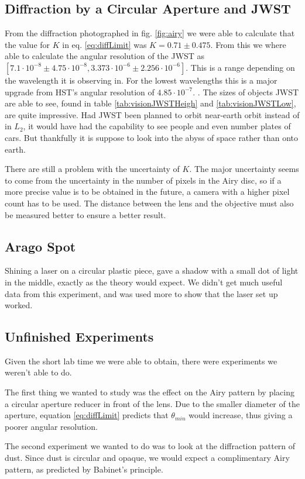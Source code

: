 \documentclass{emulateapj}
\begin{document}
\subsection{Diffraction by a Circular Aperture and JWST}
From the diffraction photographed in fig. \ref{fig:airy} we were able to calculate that the value for $K$ in eq. \ref{eq:diffLimit} was $K = 0.71 \pm 0.475$. From this we where able to calculate the angular resolution of the JWST as  $[7.1\cdot 10^{-8} \pm 4.75\cdot 10^{-8},3.373\cdot10^{-6} \pm 2.256\cdot10^{-6}]$. This is a range depending on the wavelength it is observing in. For the lowest wavelengths this is a major upgrade from HST's angular resolution of $4.85\cdot10^{-7}$. \cite{hubbel}. The sizes of objects JWST are able to see, found in table \ref{tab:visionJWSTHeigh} and \ref{tab:visionJWSTLow}, are quite impressive. Had JWST been planned to orbit near-earth orbit instead of in $L_2$, it would have had the capability to see people and even number plates of cars. But thankfully it is suppose to look into the abyss of space rather than onto earth.

There are still a problem with the uncertainty of $K$. The major uncertainty seems to come from the uncertainty in the number of pixels in the Airy disc, so if a more precise value is to be obtained in the future, a camera with a higher pixel count has to be used. The distance between the lens and the objective must also be measured better to ensure a better result.


\subsection{Arago Spot}
Shining a laser on a circular plastic piece, gave a shadow with a small dot of light in the middle, exactly as the theory would expect. We didn't get much useful data from this experiment, and was used more to show that the laser set up worked.

\subsection{Unfinished Experiments}
Given the short lab time we were able to obtain, there were experiments we weren't able to do.

The first thing we wanted to study was the effect on the Airy pattern by placing a circular aperture reducer in front of the lens. Due to the smaller diameter of the aperture, equation \eqref{eq:diffLimit} predicts that $\theta_{min}$ would increase, thus giving a poorer angular resolution.

The second experiment we wanted to do was to look at the diffraction pattern of dust. Since dust is circular and opaque, we would expect a complimentary Airy pattern, as predicted by Babinet's principle.



\end{document}
